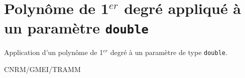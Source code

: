 %
\section{Polyn\^ome de 1$^{er}$ degr\'e appliqu\'e \`a un param\`etre \texttt{double}}

 
\label{OP-Poly_1_dbl}

Application d'un polyn\^ome de 1$^{er}$ degr\'e
\`a un param\`etre de type \texttt{double}.

\bigskip





CNRM/GMEI/TRAMM

